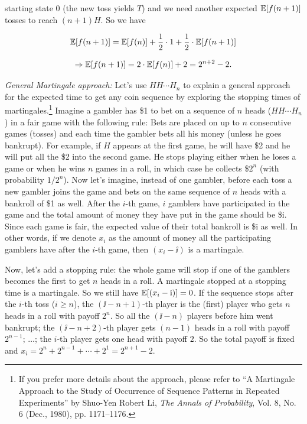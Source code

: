 
starting state $0$ (the new toss yields $T$) and we need another expected
$\mathbb{E}[f(n+1)]$ tosses to reach $(n+1)H$. So we have

\[
\mathbb{E}[f(n+1)]=\mathbb{E}[f(n)]+\frac{1}{2}\cdot1+\frac{1}{2}\cdot\mathbb{E}[f(n+1)]
\]

\[
\Rightarrow \mathbb{E}[f(n+1)]=2\cdot\mathbb{E}[f(n)]+2=2^{n+2}-2.
\]

\emph{General Martingale approach:} Let's use $HH\cdots H_n$ to explain a
general approach for the expected time to get any coin sequence by exploring the
stopping times of martingales.\footnote[9]{If you prefer more details about the
approach, please refer to ``A Martingale Approach to the Study of Occurrence of
Sequence Patterns in Repeated Experiments'' by Shuo-Yen Robert Li, \textit{The
Annals of Probability}, Vol. 8, No. 6 (Dec., 1980), pp. 1171--1176.} Imagine a
gambler has \$1 to bet on a sequence of $n$ heads ($HH\cdots H_n$) in a fair game
with the following rule: Bets are placed on up to $n$ consecutive games (tosses)
and each time the gambler bets all his money (unless he goes bankrupt). For
example, if $H$ appears at the first game, he will have \$2 and he will put all
the \$2 into the second game. He stops playing either when he loses a game or when
he wins $n$ games in a roll, in which case he collects \$\(2^n\) (with probability
$1/2^n$). Now let's imagine, instead of one gambler, before each toss a new
gambler joins the game and bets on the same sequence of $n$ heads with a bankroll
of \$1 as well. After the $i$-th game, $i$ gamblers have participated in the game
and the total amount of money they have put in the game should be \$i. Since each
game is fair, the expected value of their total bankroll is \$i as well. In other
words, if we denote $x_i$ as the amount of money all the participating gamblers
have after the $i$-th game, then $(x_i-\ii)$ is a martingale.

Now, let's add a stopping rule: the whole game will stop if one of the gamblers
becomes the first to get $n$ heads in a roll. A martingale stopped at a stopping
time is a martingale. So we still have $\mathbb{E}[(x_i-\mathrm{i})]=0$. If the sequence stops after
the $i$-th toss ($i\geq n$), the $(\ii-n+1)$-th player is the (first) player who
gets $n$ heads in a roll with payoff $2^n$. So all the $(\ii-n)$ players before him
went bankrupt; the $(\ii-n+2)$-th player gets $(n-1)$ heads in a roll with payoff
$2^{n-1}$; $\ldots$; the $i$-th player gets one head with payoff $2$. So the total
payoff is fixed and $x_i=2^n+2^{n-1}+\cdots+2^1=2^{n+1}-2$.


